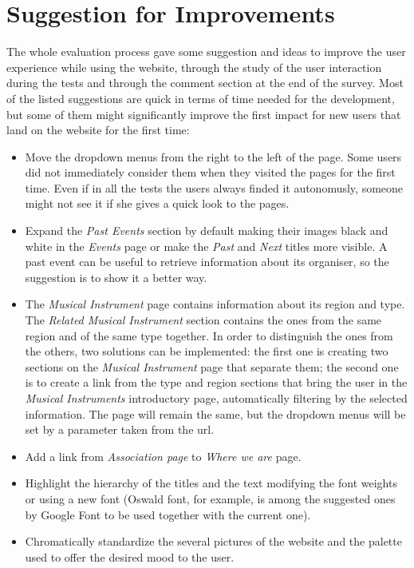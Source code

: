 \documentclass[../../UsabilityReport.tex]{subfiles}
\begin{document}
\section{Suggestion for Improvements}
	The whole evaluation process gave some suggestion and ideas to improve the user experience while using the website, through the study of the user interaction during the tests and through the comment section at the end of the survey.
	Most of the listed suggestions are quick in terms of time needed for the development, but some of them might significantly improve the first impact for new users that land on the website for the first time:
	\begin{itemize}
		\item
			Move the dropdown menus from the right to the left of the page. Some users did not immediately consider them when they visited the pages for the first time. Even if in all the tests the users always finded it autonomusly, someone might not see it if she gives a quick look to the pages.
		\item
			Expand the \textit{Past Events} section by default making their images black and white in the \textit{Events} page or make the \textit{Past} and \textit{Next} titles more visible. A past event can be useful to retrieve information about its organiser, so the suggestion is to show it a better way.
		\item
			The \textit{Musical Instrument} page contains information about its region and type. The \textit{Related Musical Instrument} section contains the ones from the same region and of the same type together. In order to distinguish the ones from the others, two solutions can be implemented: the first one is creating two sections on the \textit{Musical Instrument} page that separate them; the second one is to create a link from the type and region sections that bring the user in the \textit{Musical Instruments} introductory page, automatically filtering by the selected information. The page will remain the same, but the dropdown menus will be set by a parameter taken from the url.
		\item
			Add a link from \textit{Association page} to \textit{Where we are} page.
		\item
			Highlight the hierarchy of the titles and the text modifying the font weights or using a new font (Oswald font, for example, is among the suggested ones by Google Font to be used together with the current one).
		\item
			Chromatically standardize the several pictures of the website and the palette used to offer the desired mood to the user.
	\end{itemize}
\end{document}
